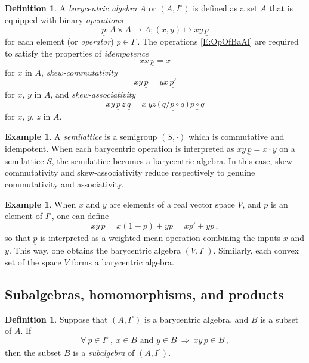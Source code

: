 \documentclass[12pt]{amsart}
\theoremstyle{plain}
\theoremstyle{definition}
\newtheorem{definition}[theorem]{Definition}
\newtheorem{example}[theorem]{Example}
\numberwithin{equation}{section}
\begin{document}
\begin{definition}\cite{RS85,RS90,Modes}
A \emph{barycentric algebra} $A$ or $(A,I^\circ)$ is defined as a set $A$ that is equipped with binary \emph{operations}
\begin{equation}\label{E:OpOfBaAl}
\underline{p}\colon A\times A\to A;(x,y)\mapsto xy\,\underline{p}
\end{equation}
for each element (or \emph{operator}) $p\in I^\circ$. The operations \eqref{E:OpOfBaAl} are required to satisfy the properties of \emph{idempotence}
\begin{equation}\label{E:idemptnc}
xx\,\underline{p}=x
\end{equation}
for $x$ in $A$, \emph{skew-commutativity}
\begin{equation}\label{E:skewcomm}
xy\,\underline{p}=yx\,\underline{p'}
\end{equation}
for $x$, $y$ in $A$, and \emph{skew-associativity}
\begin{equation}\label{E:skewasoc}
xy\,\underline{p}\,z\,\underline{q}
=x\,yz\,\big(\,\underline{q/p\circ q}\,\big)\,\underline{p\circ q}
\end{equation}
for $x$, $y$, $z$ in $A$.
\end{definition}

\begin{example}\label{X:SemiLatt}
A \emph{semilattice} is a semigroup $(S,\cdot)$ which is commutative and idempotent. When each barycentric operation is interpreted as $xy\,\underline p=x\cdot y$ on a semilattice $S$, the semilattice becomes a barycentric algebra. In this case, skew-commutativity and skew-associativity reduce respectively to genuine commutativity and associativity.
\end{example}

\begin{example}\label{X:CoAfBAlg}
When $x$ and $y$ are elements of a real vector space $V$, and $p$ is an element of $I^\circ$, one can define
\begin{equation}\label{E:punderln}
xy\,\underline{p}=x(1-p)+yp=xp'+yp \, ,
\end{equation}
so that $\underline{p}$ is interpreted as a weighted mean operation combining the inputs $x$ and $y$. This way, one obtains the barycentric algebra $(V,I^\circ)$. Similarly, each convex set of the space $V$ forms a barycentric algebra.
\end{example}



\subsection{Subalgebras, homomorphisms, and products}\label{Ss:subalg}
\begin{definition}\label{D:SbWaSink}
Suppose that $(A,I^\circ)$ is a barycentric algebra, and $B$ is a subset of $A$.
If
$$
\forall\ p\in I^\circ\,,\
x\in B
\mbox{ and }
y\in B
\
\Rightarrow
\
xy\,\underline p\in B\,,
$$
then the subset $B$ is a \emph{subalgebra} of $(A,I^\circ)$.
\end{definition}
\end{document}
